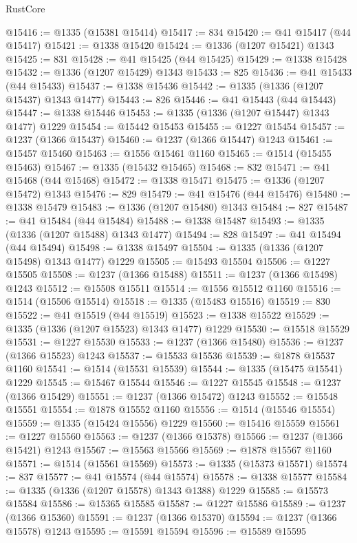 \begin{lexlean}{RustCore}
\begin{coremodule}
@15416 := @1335 (@15381 @15414)
@15417 := 834
@15420 := @41 @15417 (@44 @15417)
@15421 := @1338 @15420
@15424 := @1336 (@1207 @15421) @1343
@15425 := 831
@15428 := @41 @15425 (@44 @15425)
@15429 := @1338 @15428
@15432 := @1336 (@1207 @15429) @1343
@15433 := 825
@15436 := @41 @15433 (@44 @15433)
@15437 := @1338 @15436
@15442 := @1335 (@1336 (@1207 @15437) @1343 @1477)
@15443 := 826
@15446 := @41 @15443 (@44 @15443)
@15447 := @1338 @15446
@15453 := @1335 (@1336 (@1207 @15447) @1343 @1477) @1229
@15454 := @15442 @15453
@15455 := @1227 @15454
@15457 := @1237 (@1366 @15437)
@15460 := @1237 (@1366 @15447) @1243
@15461 := @15457 @15460
@15463 := @1556 @15461 @1160
@15465 := @1514 (@15455 @15463)
@15467 := @1335 (@15432 @15465)
@15468 := 832
@15471 := @41 @15468 (@44 @15468)
@15472 := @1338 @15471
@15475 := @1336 (@1207 @15472) @1343
@15476 := 829
@15479 := @41 @15476 (@44 @15476)
@15480 := @1338 @15479
@15483 := @1336 (@1207 @15480) @1343
@15484 := 827
@15487 := @41 @15484 (@44 @15484)
@15488 := @1338 @15487
@15493 := @1335 (@1336 (@1207 @15488) @1343 @1477)
@15494 := 828
@15497 := @41 @15494 (@44 @15494)
@15498 := @1338 @15497
@15504 := @1335 (@1336 (@1207 @15498) @1343 @1477) @1229
@15505 := @15493 @15504
@15506 := @1227 @15505
@15508 := @1237 (@1366 @15488)
@15511 := @1237 (@1366 @15498) @1243
@15512 := @15508 @15511
@15514 := @1556 @15512 @1160
@15516 := @1514 (@15506 @15514)
@15518 := @1335 (@15483 @15516)
@15519 := 830
@15522 := @41 @15519 (@44 @15519)
@15523 := @1338 @15522
@15529 := @1335 (@1336 (@1207 @15523) @1343 @1477) @1229
@15530 := @15518 @15529
@15531 := @1227 @15530
@15533 := @1237 (@1366 @15480)
@15536 := @1237 (@1366 @15523) @1243
@15537 := @15533 @15536
@15539 := @1878 @15537 @1160
@15541 := @1514 (@15531 @15539)
@15544 := @1335 (@15475 @15541) @1229
@15545 := @15467 @15544
@15546 := @1227 @15545
@15548 := @1237 (@1366 @15429)
@15551 := @1237 (@1366 @15472) @1243
@15552 := @15548 @15551
@15554 := @1878 @15552 @1160
@15556 := @1514 (@15546 @15554)
@15559 := @1335 (@15424 @15556) @1229
@15560 := @15416 @15559
@15561 := @1227 @15560
@15563 := @1237 (@1366 @15378)
@15566 := @1237 (@1366 @15421) @1243
@15567 := @15563 @15566
@15569 := @1878 @15567 @1160
@15571 := @1514 (@15561 @15569)
@15573 := @1335 (@15373 @15571)
@15574 := 837
@15577 := @41 @15574 (@44 @15574)
@15578 := @1338 @15577
@15584 := @1335 (@1336 (@1207 @15578) @1343 @1388) @1229
@15585 := @15573 @15584
@15586 := @15365 @15585
@15587 := @1227 @15586
@15589 := @1237 (@1366 @15360)
@15591 := @1237 (@1366 @15370)
@15594 := @1237 (@1366 @15578) @1243
@15595 := @15591 @15594
@15596 := @15589 @15595

\end{coremodule}
\end{lexlean}
